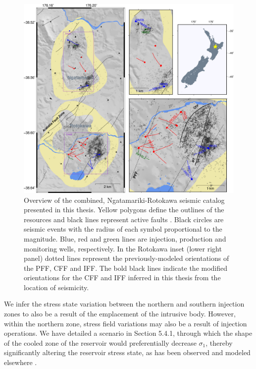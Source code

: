 \begin{figure}[h!]
\begin{center}
\includegraphics[width=1.00\columnwidth]{Chapter_6_Synthesis/figures/overview_seis/merc_RotNga_overview_seis_chap6}
\caption[The combined Ngatamariki-Rotokawa seismic catalog]{{
Overview of the combined, Ngatamariki-Rotokawa seismic catalog presented in this thesis. Yellow polygons define the outlines of the resources and black lines represent active faults \citep{AFDB}. Black circles are seismic events with the radius of each symbol proportional to the magnitude. Blue, red and green lines are injection, production and monitoring wells, respectively. In the Rotokawa inset (lower right panel) dotted lines represent the previously-modeled orientations of the \acrshort{PFF}, \acrshort{CFF} and \acrshort{IFF}. The bold black lines indicate the modified orientations for the \acrshort{CFF} and \acrshort{IFF} inferred in this thesis from the location of seismicity.
{\label{seis_overview}}%
}}
\end{center}
\end{figure}

We infer the stress state variation between the northern and southern injection zones to also be a result of the emplacement of the intrusive body. However, within the northern zone, stress field variations may also be a result of injection operations. We have detailed a scenario in Section 5.4.1, through which the shape of the cooled zone of the reservoir would preferentially decrease $\sigma_{1}$, thereby significantly altering the reservoir stress state, as has been observed and modeled elsewhere \citep{Mart_nez_Garz_n_2013,Jeanne_2015tensor}.

